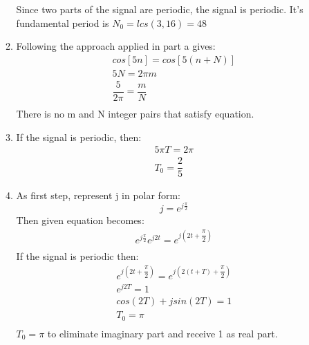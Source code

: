 \documentclass[10pt,a4paper, margin=1in]{article}
\begin{document}
\begin{enumerate}
\begin{enumerate}
    Since two parts of the signal are periodic, the signal is periodic. It's fundamental period is $N_0 = lcs(3,16) = 48$\\
    \item %
    Following the approach applied in part a gives:\\
    \begin{equation}
        \begin{split}
            cos[5n] = cos[5(n+N)]\\
            5N = 2\pi m\\
            \dfrac{5}{2\pi} = \dfrac{m}{N}\\
        \end{split}
    \end{equation}
    There is no m and N integer pairs that satisfy equation.
    \item %
    If the signal is periodic, then:\\
    \begin{equation}
        \begin{split}
            5\pi T = 2\pi\\
            T_0 = \dfrac{2}{5}
        \end{split}
    \end{equation}
    \item %
    As first step, represent j in polar form:\\
    \begin{equation}
        j = e^{j\frac{\pi}{2}}
    \end{equation}
    Then given equation becomes:
    \begin{equation}
        \begin{split}
            e^{j\frac{\pi}{2}}e^{j2t} = e^{j(2t+\dfrac{\pi}{2})}\\
        \end{split}
    \end{equation}
    If the signal is periodic then:
    \begin{equation}
        \begin{split}
            e^{j(2t+\dfrac{\pi}{2})} = e^{j(2(t+T)+\dfrac{\pi}{2})}\\
            e^{j2T} = 1\\
            cos(2T) + j sin(2T) = 1\\
            T_0 = \pi\\
        \end{split}
    \end{equation}
    $T_0 = \pi$ to eliminate imaginary part and receive 1 as real part.
    \end{enumerate}


\end{enumerate}
\end{document}

